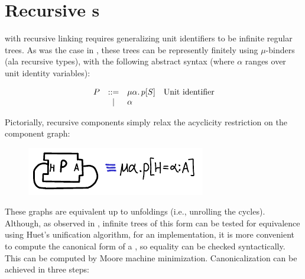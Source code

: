 \section{Recursive \uid{}s}


\Backpack{} with recursive linking requires generalizing unit
identifiers to be infinite regular trees.  As was the case
in \OldBackpack{}, these trees can be
represently finitely using $\mu$-binders (ala recursive types),
with the following abstract syntax (where $\alpha$ ranges over
unit identity variables):

\[
\begin{array}{rcll}
  \UP &::=& \mu\alpha.\, \icid{\Up}{S} & \text{\Uid} \\
      & | & \alpha \\
\end{array}
\]




Pictorially, recursive components simply relax the acyclicity restriction on
the component graph:

\begin{figure}[H]
\center\includegraphics{figures/recursive-unit-identifier.pdf}
\end{figure}

These graphs are equivalent up to unfoldings (i.e., unrolling the
cycles).
Although, as observed in \OldBackpack{}, infinite trees of this form
can be tested for equivalence using Huet's unification algorithm,
for an implementation, it is more convenient to compute the canonical form
of a \uid{}, so equality can be checked syntactically.  This can be
computed by Moore machine minimization.  Canonicalization can be achieved
in three steps:

